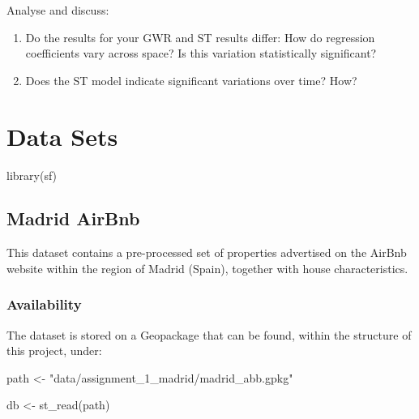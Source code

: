 \documentclass[
]{book}
\newenvironment{Shaded}{\begin{snugshade}}{\end{snugshade}}
\newcommand{\FunctionTok}[1]{\textcolor[rgb]{0.00,0.00,0.00}{#1}}
\newcommand{\NormalTok}[1]{#1}
\newcommand{\OtherTok}[1]{\textcolor[rgb]{0.56,0.35,0.01}{#1}}
\newcommand{\StringTok}[1]{\textcolor[rgb]{0.31,0.60,0.02}{#1}}
\providecommand{\tightlist}{%
  \setlength{\itemsep}{0pt}\setlength{\parskip}{0pt}}
\begin{document}
Analyse and discuss:

\begin{enumerate}
\def\labelenumi{\arabic{enumi}.}
\tightlist
\item
  Do the results for your GWR and ST results differ: How do regression coefficients vary across space? Is this
  variation statistically significant?
\item
  Does the ST model indicate significant variations over time? How?
\end{enumerate}

\hypertarget{datasets}{%
\chapter{Data Sets}\label{datasets}}

\begin{Shaded}
\begin{Highlighting}[]
\FunctionTok{library}\NormalTok{(sf)}
\end{Highlighting}
\end{Shaded}

\hypertarget{madrid-airbnb}{%
\section{Madrid AirBnb}\label{madrid-airbnb}}

This dataset contains a pre-processed set of properties advertised on the AirBnb website within the region of Madrid (Spain), together with house characteristics.

\hypertarget{availability}{%
\subsection*{Availability}\label{availability}}

The dataset is stored on a Geopackage that can be found, within the structure of this project, under:

\begin{Shaded}
\begin{Highlighting}[]
\NormalTok{path }\OtherTok{\textless{}{-}} \StringTok{"data/assignment\_1\_madrid/madrid\_abb.gpkg"}
\end{Highlighting}
\end{Shaded}

\begin{Shaded}
\begin{Highlighting}[]
\NormalTok{db }\OtherTok{\textless{}{-}} \FunctionTok{st\_read}\NormalTok{(path)}
\end{Highlighting}
\end{Shaded}
\end{document}
